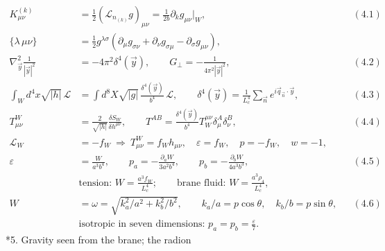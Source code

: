 \documentclass[10pt,a4paper]{article}
\makeatletter
\renewcommand\section{\@startsection{section}{1}{\z@}{-3.5ex \@plus -1ex \@minus -.2ex}{2.3ex \@plus.2ex}{\normalfont\Large\bfseries\raggedright}}
\makeatother
\begin{document}
\begin{align*}
K^{(k)}_{\mu\nu}&=\frac12(\mathcal L_{n_{(k)}}g)_{\mu\nu}=\frac1{2b}\partial_kg_{\mu\nu}\Big|_W,&&(4.1) \\
\{\lambda\,\mu\nu\}&=\frac12g^{\lambda\sigma}(\partial_\mu g_{\sigma\nu}+\partial_\nu g_{\sigma\mu}-\partial_\sigma g_{\mu\nu}), \\
\nabla_{\vec y}^2\frac1{|\vec y|^2}&=-4\pi^2\delta^4(\vec y),\qquad G_\perp=-\frac1{4\pi^2|\vec y|^2},&&(4.2) \\
\int_Wd^4x\sqrt{|h|}\,\mathcal L&=\int d^8X\sqrt{|g|}\,\frac{\delta^4(\vec y)}{b^4}\,\mathcal L,\qquad \delta^4(\vec y)=\frac1{L_c^4}\sum_{\vec n}e^{i\vec q_{\vec n}\cdot\vec y},&&(4.3) \\
T^W_{\mu\nu}&=\frac2{\sqrt{|h|}}\frac{\delta S_W}{\delta h^{\mu\nu}},\qquad T^{AB}=\frac{\delta^4(\vec y)}{b^4}T_W^{\mu\nu}\delta^A_\mu\delta^B_\nu,&&(4.4) \\
\mathcal L_W&=-f_W\ \Rightarrow\ T^W_{\mu\nu}=f_Wh_{\mu\nu},\quad \varepsilon=f_W,\quad p=-f_W,\quad w=-1, \\
\varepsilon&=\frac W{a^3b^4},\qquad p_a=-\frac{\partial_aW}{3a^2b^4},\qquad p_b=-\frac{\partial_bW}{4a^3b^3},&&(4.5) \\
&\text{tension: }W=\frac{a^3f_W}{L_c^4};\qquad\text{brane fluid: }W=\frac{a^3\rho_4}{L_c^4}, \\
W&=\omega=\sqrt{k_a^2/a^2+k_b^2/b^2},\qquad k_a/a=p\cos\theta,\quad k_b/b=p\sin\theta,&&(4.6) \\
&\text{isotropic in seven dimensions: }p_a=p_b=\frac\varepsilon7.
\end{align*}
\section*{5. Gravity seen from the brane; the radion}
\end{document}
